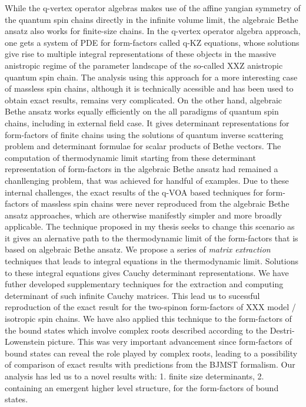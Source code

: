 \documentclass[a4paper, 11pt, DIV=15]{scrarticle}
\begin{document}
While the q-vertex operator algebras makes use of the affine yangian symmetry of the quantum spin chains directly in the infinite volume limit, the algebraic Bethe ansatz also works for finite-size chains.
In the q-vertex operator algebra approach, one gets a system of PDE for form-factors called q-KZ equations, whose solutions give rise to multiple integral representations of these objects in the massive anistropic regime of the parameter landscape of the so-called XXZ anistropic quantum spin chain. The analysis using this approach for a more interesting case of massless spin chains, although it is technically acessible and has been used to obtain exact results, remains very complicated.
On the other hand, algebraic Bethe ansatz works equally efficiently on the all paradigms of quantum spin chains, including in external field case. It gives determinant representations for form-factors of finite chains using the solutions of quantum inverse scattering problem and determinant formulae for scalar products of Bethe vectors.
The computation of thermodynamic limit starting from these determinant representation of form-factors in the algebraic Bethe ansatz had remained a chanllenging problem, that was achieved for handful of examples.
Due to these internal challenges, the exact results of the q-VOA based techniques for form-factors of massless spin chains were never reproduced from the algebraic Bethe ansatz approaches, which are otherwise manifestly simpler and more broadly applicable.
The technique proposed in my thesis seeks to change this scenario as it gives an alernative path to the thermodynamic limit of the form-factors that is based on algebraic Bethe ansatz.
We propose a series of \textit{matrix extraction} techniques that leads to integral equations in the thermodynamic limit. Solutions to these integral equations gives Cauchy determinant representations. We have futher developed supplementary techniques for the extraction and computing determinant of such infinite Cauchy matrices.
This lead us to sucessful reproduction of the exact result for the two-spinon form-factors of XXX model / isotropic spin chains.
We have also applied this technique to the form-factors of the bound states which involve complex roots described according to the Destri-Lowenstein picture.
This was very important advancement since form-factors of bound states can reveal the role played by complex roots, leading to a possibility of comparison of exact results with predictions from the BJMST formalism.
Our analysis has led us to a novel results with: 1. finite size determinants, 2. containing an emergent higher level structure, for the form-factors of bound states.
\end{document}
